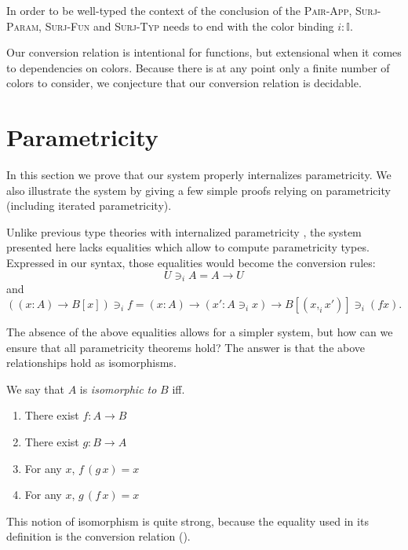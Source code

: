 \documentclass[english]{PaperTools/latex/lipics}
\newcommand\CP[3]{(#2,_{#1} #3)}
\newcommand\CTimes[2]{(#2) ×_{#1}}
\newcommand\param[1]{\!\cdot\!#1}
\newcommand\op[1]{∋_{#1}}
\newcommand\fp[3]{⟨#2 ,_{#1} #3⟩}
\newcommand\mor[2]{({#1}\,{#2})}
\newcommand\proj[2]{{#2}\mor{#1}0}
\begin{document}
\begin{remark}
  In order to be well-typed the context of the conclusion of the
  \textsc{Pair-App}, \textsc{Surj-Param}, \textsc{Surj-Fun} and
  \textsc{Surj-Typ} needs to end with the color binding $i : 𝕀$.
\end{remark}


Our conversion relation is intentional for functions, but extensional
when it comes to dependencies on colors. Because there is at any point
only a finite number of colors to consider, we conjecture that our
conversion relation is decidable.

\section{Parametricity}
\label{sec:parametricity}
In this section we prove that our system properly internalizes
parametricity. We also illustrate the system by giving a few simple
proofs relying on parametricity (including iterated parametricity).

Unlike previous type theories with internalized parametricity
\citep{bernardy_computational_2012, bernardy_type-theory_2013}, the
system presented here lacks equalities which allow to compute
parametricity types. Expressed in our syntax, those equalities would become the conversion rules:
$$U \op i A = A → U$$
and
$$((x:A) → B[x]) \op i f = (x:A) → (x' : A \op i x) → B[\CP i x {x'}] \op i (f x).$$

The absence of the above equalities allows for a simpler system, but
how can we ensure that all parametricity theorems hold?  The answer is
that the above relationships hold as isomorphisms.

We say that $A$ is \emph{isomorphic to} $B$ iff.
\begin{enumerate}
  \item There exist $f : A → B$
  \item There exist $g : B → A$
  \item For any $x$, $f\, (g\, x) = x$
  \item For any $x$, $g\, (f\, x) = x$
\end{enumerate}
This notion of isomorphism is quite strong, because the equality used
in its definition is the conversion relation ().
\end{document}
